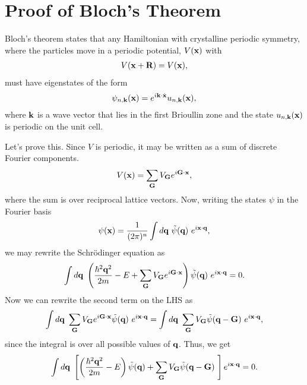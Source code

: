 \newpage

\appendix

\section{Proof of Bloch's Theorem}\label{appendix:bloch_proof}
Bloch's theorem states that any Hamiltonian with crystalline periodic symmetry, where the particles move in a periodic potential, $V(\bf x)$ with
\begin{align}
    V(\bf x + \bf R) = V(\bf x),
\end{align}
must have eigenstates of the form
\begin{align}
    \psi_{n,\bf{k}}(\bf{x} )  = e^{i\bf{k}\cdot \hat{\bf{x}}}  u_{n,\bf{k}}(\bf{x} ) ,
\end{align}
where $\bf k$ is a wave vector that lies in the first Brioullin zone and the state $u_{n,\bf{k}}(\bf{x} )$ is periodic on the unit cell. \par
Let's prove this. Since $V$ is periodic, it may be written as a sum of discrete Fourier components.
\begin{align}
    V(\bf{x}) = \sum_{\bf{G}} V_{\bf{G}} e^{i \bf{G} \cdot \bf{x}},
\end{align}
where the sum is over reciprocal lattice vectors. Now, writing the states $\psi$ in the Fourier basis
\begin{equation}
    \psi(\bf{x}) = \frac{1}{(2\pi)^n} \int d\bf{q}\ \tilde{\psi}(\bf{q})\ e^{i \bf{x}\cdot \bf{q}},
\end{equation}
we may rewrite the Schr\"{o}dinger equation as
\begin{equation}
    \int d\bf{q}\ \left ( \frac{\hbar^2 \bf{q}^2}{2m}- E + \sum_\bf{G}V_{\bf{G}} e^{i \bf{G} \cdot \bf{x}} \right )\tilde{\psi}(\bf{q})\ e^{i \bf{x}\cdot \bf{q}} = 0 .
\end{equation}
Now we can rewrite the second term on the LHS as
\begin{align}
    \int d\bf{q}\ \sum_\bf{G} V_\bf{G} e^{i\bf{G}\cdot\bf{x}} \tilde{\psi}(\bf{q})\ e^{i \bf{x}\cdot \bf{q}} = \int d\bf{q}\ \sum_\bf{G} V_\bf{G} \tilde{\psi}(\bf{q}-\bf{G})\ e^{i \bf{x}\cdot \bf{q}},
\end{align}
since the integral is over all possible values of $\bf{q}$. Thus, we get
\begin{equation}
    \int d\bf{q}\ \left [ \left ( \frac{\hbar^2 \bf{q}^2}{2m}- E  \right )\tilde{\psi}(\bf{q}) + \sum_\bf{G}V_{\bf{G}} \tilde{\psi}(\bf{q}-\bf{G})\ \right ] e^{i \bf{x}\cdot \bf{q}} = 0 .
\end{equation}
